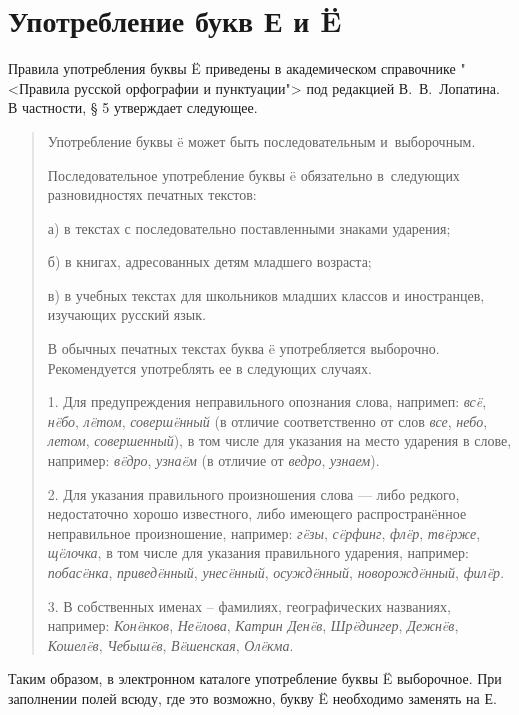 \section{Употребление букв Е и \"E}

Правила употребления буквы \"E приведены в академическом справочнике "<Правила русской орфографии и пунктуации"> под редакцией В.~В.~Лопатина. В частности, \S{} 5 утверждает следующее.

\begin{quotation}
    Употребление буквы \"e может быть последовательным и~выборочным.
    
    Последовательное употребление буквы \"e обязательно в~следующих разновидностях печатных текстов:
    
    а) в текстах с последовательно поставленными знаками ударения;
    
    б) в книгах, адресованных детям младшего возраста;
    
    в) в учебных текстах для школьников младших классов и иностранцев, изучающих русский язык.
    
    В обычных печатных текстах буква \"e употребляется выборочно. Рекомендуется употреблять ее в следующих случаях.
    
    1. Для предупреждения неправильного опознания слова, напримеп: \emph{вс\"e}, \emph{н\"eбо}, \emph{л\"eтом}, \emph{соверш\"eнный} (в отличие соответственно от слов \emph{все}, \emph{небо}, \emph{летом}, \emph{совершенный}), в том числе для указания на место ударения в слове, например: \emph{в\"eдро}, \emph{узна\"eм} (в отличие от \emph{ведро}, \emph{узнаем}).
    
    2. Для указания правильного произношения слова — либо редкого, недостаточно хорошо известного, либо имеющего распростран\"eнное неправильное произношение, например: \emph{г\"eзы}, \emph{с\"eрфинг}, \emph{фл\"eр}, \emph{тв\"eрже}, \emph{щ\"eлочка}, в том числе для указания правильного ударения, например: \emph{побас\"eнка}, \emph{привед\"eнный}, \emph{унес\"eнный}, \emph{осужд\"eнный}, \emph{новорожд\"eнный}, \emph{фил\"eр}.
    
    3. В собственных именах -- фамилиях, географических названиях, например: \emph{Кон\"eнков}, \emph{Не\"eлова}, \emph{Катрин Ден\"eв}, \emph{Шр\"eдингер}, \emph{Дежн\"eв}, \emph{Кошел\"eв}, \emph{Чебыш\"eв}, \emph{В\"eшенская}, \emph{Ол\"eкма}.
\end{quotation}

Таким образом, в электронном каталоге употребление буквы \"E выборочное. При заполнении полей всюду, где это возможно, букву \"E необходимо заменять на Е.
